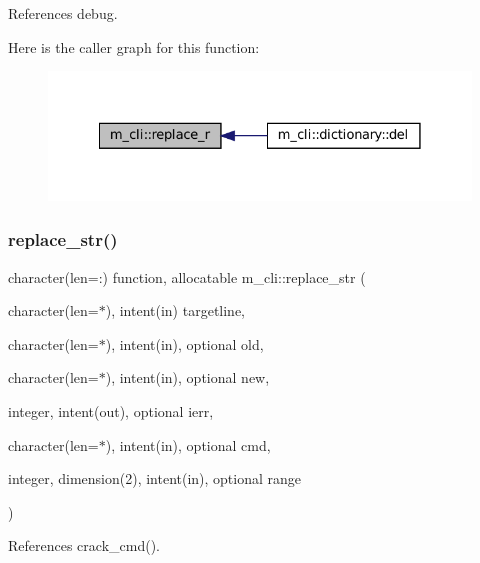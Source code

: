 References debug.

Here is the caller graph for this function\+:
\nopagebreak
\begin{figure}[H]
\begin{center}
\leavevmode
\includegraphics[width=328pt]{namespacem__cli_ab3b33abc8a6da174d3f27c2f2203038c_icgraph}
\end{center}
\end{figure}
\mbox{\label{namespacem__cli_a40e02b1c9fc580ddd410bb24017fab8c}} 
\subsubsection{\texorpdfstring{replace\+\_\+str()}{replace\_str()}}
{\footnotesize\ttfamily character(len=\+:) function, allocatable m\+\_\+cli\+::replace\+\_\+str (\begin{DoxyParamCaption}\item[{character(len=$\ast$), intent(in)}]{targetline,  }\item[{character(len=$\ast$), intent(in), optional}]{old,  }\item[{character(len=$\ast$), intent(in), optional}]{new,  }\item[{integer, intent(out), optional}]{ierr,  }\item[{character(len=$\ast$), intent(in), optional}]{cmd,  }\item[{integer, dimension(2), intent(in), optional}]{range }\end{DoxyParamCaption})\hspace{0.3cm}{\ttfamily [private]}}



References crack\+\_\+cmd().

